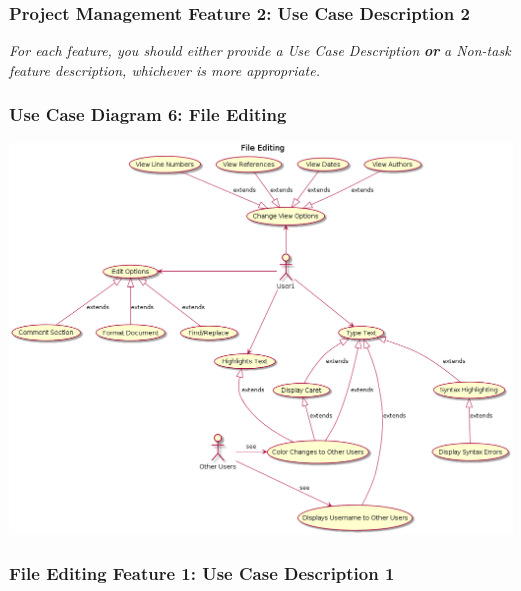 \documentclass[twoside,letterpaper]{article}
\begin{document}
\subsubsection[Project Management Feature 2: Use Case Description 2]{\rmfamily\bfseries\color{black}
	Project Management Feature 2: Use Case Description 2}
\hypertarget{RefHeading22059017292}{}
\bigskip

{\color{black}
	\foreignlanguage{english}{\textit{For each feature, you should either provide a Use Case Description
		}}\foreignlanguage{english}{\textbf{\textit{or}}}\foreignlanguage{english}{\textit{ a Non-task feature description,
		whichever is more appropriate.}}}
\newpage

\subsubsection[Use Case Diagram 6: File Editing]{\rmfamily\bfseries\color{black}
	Use Case Diagram 6: File Editing}

\includegraphics[width=\textwidth]{images/UseCases/FileEditing}

\newpage

\subsubsection[File Editing Feature 1: Use Case Description 1]{\rmfamily\bfseries\color{black}
	File Editing Feature 1: Use Case Description 1}
\hypertarget{RefHeading22059017292}{}
\bigskip
\end{document}
